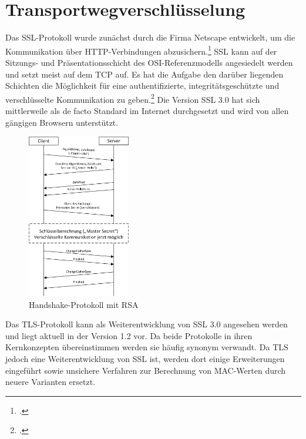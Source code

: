 \chapter{Transportwegverschlüsselung}
Das \ac{SSL}-Protokoll wurde zunächst durch die Firma Netscape entwickelt, um die Kommunikation über \ac{HTTP}-Verbindungen abzusichern.\footcite[Vgl.][S. 796]{Eckert2013} \ac{SSL} kann auf der Sitzungs- und Präsentationsschicht des \ac{OSI}-Referenzmodells angesiedelt werden und setzt meist auf dem \ac{TCP} auf. Es hat die Aufgabe den darüber liegenden Schichten die Möglichkeit für eine authentifizierte, integritätsgeschützte und verschlüsselte Kommunikation zu geben.\footcite[Vgl.][S. 799 ff.]{Eckert2013}
Die Version \ac{SSL} 3.0 hat sich mittlerweile als de facto Standard im Internet durchgesetzt und wird von allen gängigen Browsern unterstützt.

\begin{figure} %
	\begin{center}
		\includegraphics[width=0.4\textwidth]{images/MSC_Transport.png}
	\end{center}
	\caption[Handshake-Protokoll mit RSA]{Handshake-Protokoll mit RSA\footnotemark} %
	\label{img:MSC_Transport} %
\end{figure} %
Das \ac{TLS}-Protokoll kann als Weiterentwicklung von \ac{SSL} 3.0 angesehen werden und liegt aktuell in der Version 1.2 vor.
Da beide Protokolle in ihren Kernkonzepten übereinstimmen werden sie häufig synonym verwandt. Da \ac{TLS} jedoch eine Weiterentwicklung von \ac{SSL} ist, werden dort einige Erweiterungen eingeführt sowie unsichere Verfahren zur Berechnung von \ac{MAC}-Werten durch neuere Varianten ersetzt.

